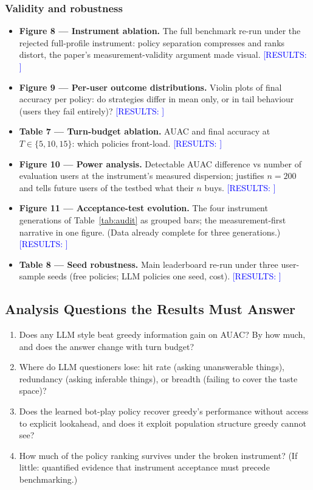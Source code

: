 \documentclass[11pt]{article}
\newcommand{\results}[1]{\textcolor{blue}{[RESULTS: #1]}}
\begin{document}
\subsubsection*{Validity and robustness}
\begin{itemize}
  \item \textbf{Figure 8 --- Instrument ablation.} The full benchmark
  re-run under the rejected full-profile instrument: policy separation
  compresses and ranks distort, the paper's measurement-validity argument
  made visual. \results{}
  \item \textbf{Figure 9 --- Per-user outcome distributions.} Violin plots
  of final accuracy per policy: do strategies differ in mean only, or in
  tail behaviour (users they fail entirely)? \results{}
  \item \textbf{Table 7 --- Turn-budget ablation.} AUAC and final accuracy
  at $T \in \{5, 10, 15\}$: which policies front-load. \results{}
  \item \textbf{Figure 10 --- Power analysis.} Detectable AUAC difference
  vs number of evaluation users at the instrument's measured dispersion;
  justifies $n = 200$ and tells future users of the testbed what their
  $n$ buys. \results{}
  \item \textbf{Figure 11 --- Acceptance-test evolution.} The four
  instrument generations of Table~\ref{tab:audit} as grouped bars; the
  measurement-first narrative in one figure. (Data already complete for
  three generations.) \results{}
  \item \textbf{Table 8 --- Seed robustness.} Main leaderboard re-run
  under three user-sample seeds (free policies; LLM policies one seed,
  cost). \results{}
\end{itemize}

\subsection{Analysis Questions the Results Must Answer}

\begin{enumerate}
  \item Does any LLM style beat greedy information gain on AUAC? By how
  much, and does the answer change with turn budget?
  \item Where do LLM questioners lose: hit rate (asking unanswerable
  things), redundancy (asking inferable things), or breadth (failing to
  cover the taste space)?
  \item Does the learned bot-play policy recover greedy's performance
  without access to explicit lookahead, and does it exploit population
  structure greedy cannot see?
  \item How much of the policy ranking survives under the broken
  instrument? (If little: quantified evidence that instrument acceptance
  must precede benchmarking.)
\end{enumerate}
\end{document}
